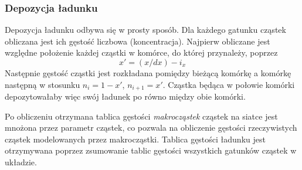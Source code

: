     \subsubsection{Depozycja ładunku}

     Depozycja ładunku odbywa się w prosty sposób. Dla każdego gatunku
    cząstek obliczana jest ich gęstość liczbowa (koncentracja). Najpierw
    obliczane jest względne położenie każdej cząstki w komórce, do której
    przynależy, poprzez
    \begin{equation}
    x' = (x/dx) - i_x
    \label{eqn:relative-position}
    \end{equation}
    Następnie gęstość cząstki jest rozkładana pomiędzy bieżącą komórkę a
    komórkę następną w stosunku $n_i = 1-x'$, $n_{i+1} = x'$. Cząstka będąca
    w połowie komórki depozytowałaby więc swój ładunek po równo między obie
    komórki.



    Po obliczeniu otrzymana tablica gęstości \emph{makrocząstek} cząstek na
    siatce jest mnożona przez parametr  cząstek, co pozwala na
    obliczenie gęstości rzeczywistych cząstek modelowanych przez makrocząstki.
    Tablica gęstości ładunku jest otrzymywana poprzez zsumowanie tablic gęstości
    wszystkich gatunków cząstek w układzie.



